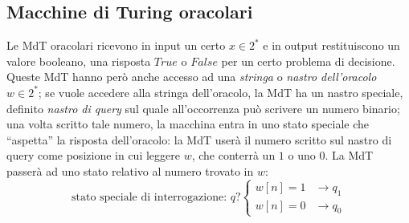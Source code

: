 \subsection{Macchine di Turing oracolari}
Le MdT oracolari ricevono in input un certo $x \in 2^*$ e in output restituiscono
un valore booleano, una risposta $True$ o $False$ per un certo problema di decisione.
Queste MdT hanno però anche accesso ad una \textit{stringa} o
\textit{nastro dell'oracolo} $w \in 2^*$;
se vuole accedere alla stringa dell'oracolo, la MdT ha un nastro speciale,
definito \textit{nastro di query} sul quale all'occorrenza può scrivere un numero
binario; una volta scritto tale numero, la macchina entra in uno stato speciale
che ``aspetta'' la risposta dell'oracolo: la MdT userà il numero scritto sul nastro
di query come posizione in cui leggere $w$, che conterrà un $1$ o uno $0$.
La MdT passerà ad uno stato relativo al numero trovato in $w$:
$$
	\text{stato speciale di interrogazione: } q?
	\begin{cases}
		w[n] = 1 & \rightarrow q_1 \\
		w[n] = 0 & \rightarrow q_0
	\end{cases}
$$
